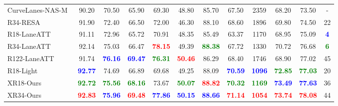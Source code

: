\documentclass[preprint,12pt,review]{elsarticle}
\begin{document}
\begin{table*}[htbp]
{\begin{tabular}{l||ccccccccc|c|c}
			CurveLanes-NAS-M~\cite{curvelane} &90.20 &70.50 &65.90 &69.30 &48.80 &85.70 &67.50 &2359 &68.20 &73.50&-\\
		    R34-RESA~\cite{resa} &91.90 &72.40  &66.50 &72.00 &46.30 &88.10 &68.60 &1896 &69.80 &74.50 &22 \\
			R18-LaneATT~\cite{laneatt} &91.11 &72.96 &65.72 &70.91 &48.35 &85.49 &63.37 &1170 &68.95 &75.09 &\textcolor{blue}{\bf{4}}\\
			R34-LaneATT~\cite{laneatt} &92.14 &75.03 &66.47 &\textcolor{red}{\bf{78.15}} &49.39 &\textcolor{green}{\bf{88.38}} &67.72 &1330 &70.72 &76.68 &\textcolor{green}{\bf{6}}\\
			R122-LaneATT~\cite{laneatt} &91.74 &\textcolor{blue}{\bf{76.16}} &\textcolor{blue}{\bf{69.47}} &\textcolor{green}{\bf{76.31}} &\textcolor{red}{\bf{50.46}} &86.29 &68.40 &1746 &68.90 &77.02 &45\\
			\hline\hline
			R18-Light &\textcolor{blue}{\bf{92.77}} &74.69 &66.89 &69.68 &49.25 &88.09 &\textcolor{blue}{\bf{70.59}} &\textcolor{blue}{\bf{1096}} &\textcolor{green}{\bf{72.85}} &\textcolor{green}{\bf{77.03}} &20\\
			
			XR18-Ours &\textcolor{green}{\bf{92.72}} &\textcolor{green}{\bf{75.56}} &\textcolor{green}{\bf{68.16}} &73.67 &\textcolor{green}{\bf{50.07}} &\textcolor{red}{\bf{88.82}} &\textcolor{green}{\bf{70.32}} &\textcolor{green}{\bf{1169}} &\textcolor{blue}{\bf{73.49}} &\textcolor{blue}{\bf{77.63}} &36\\
			
			XR34-Ours &\textcolor{red}{\bf{92.83}} &\textcolor{blue}{\bf{75.96}} &\textcolor{red}{\bf{69.48}} &\textcolor{blue}{\bf{77.86}} &\textcolor{blue}{\bf{50.15}} &\textcolor{blue}{\bf{88.66}} &\textcolor{red}{\bf{71.14}} &\textcolor{red}{\bf{1054}} &\textcolor{red}{\bf{73.74}} &\textcolor{red}{\bf{78.08}} &44\\
			\bottomrule[1pt]  
		\end{tabular}
	}
	\label{table:culane}
\end{table*}
\end{document}
